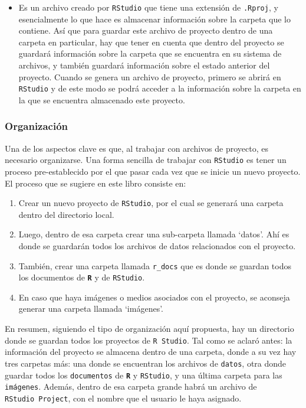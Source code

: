 \documentclass[
]{article}
\providecommand{\tightlist}{%
  \setlength{\itemsep}{0pt}\setlength{\parskip}{0pt}}
\begin{document}
\begin{itemize}
\tightlist
\item
  Es un archivo creado por \texttt{RStudio} que tiene una extensión de \texttt{.Rproj}, y esencialmente lo que hace es almacenar información sobre la carpeta que lo contiene. Así que para guardar este archivo de proyecto dentro de una carpeta en particular, hay que tener en cuenta que dentro del proyecto se guardará información sobre la carpeta que se encuentra en su sistema de archivos, y también guardará información sobre el estado anterior del proyecto. Cuando se genera un archivo de proyecto, primero se abrirá en \texttt{RStudio} y de este modo se podrá acceder a la información sobre la carpeta en la que se encuentra almacenado este proyecto.
\end{itemize}

\hypertarget{organizaciuxf3n}{%
\subsubsection{Organización}\label{organizaciuxf3n}}

Una de los aspectos clave es que, al trabajar con archivos de proyecto, es necesario organizarse. Una forma sencilla de trabajar con \texttt{RStudio} es tener un proceso pre-establecido por el que pasar cada vez que se inicie un nuevo proyecto. El proceso que se sugiere en este libro consiste en:

\begin{enumerate}
\def\labelenumi{\arabic{enumi}.}
\item
  Crear un nuevo proyecto de \texttt{RStudio}, por el cual se generará una carpeta dentro del directorio local.
\item
  Luego, dentro de esa carpeta crear una sub-carpeta llamada `datos'. Ahí es donde se guardarán todos los archivos de datos relacionados con el proyecto.
\item
  También, crear una carpeta llamada \texttt{r\_docs} que es donde se guardan todos los documentos de \textbf{\texttt{R}} y de \texttt{RStudio}.
\item
  En caso que haya imágenes o medios asociados con el proyecto, se aconseja generar una carpeta llamada `imágenes'.
\end{enumerate}

En resumen, siguiendo el tipo de organización aquí propuesta, hay un directorio donde se guardan todos los proyectos de \texttt{R\ Studio}. Tal como se aclaró antes: la información del proyecto se almacena dentro de una carpeta, donde a su vez hay tres carpetas más: una donde se encuentran los archivos de \texttt{datos}, otra donde guardar todos los \texttt{documentos} de \textbf{\texttt{R}} y \texttt{RStudio}, y una última carpeta para las \texttt{imágenes}. Además, dentro de esa carpeta grande habrá un archivo de \texttt{RStudio\ Project}, con el nombre que el usuario le haya asignado.
\end{document}
